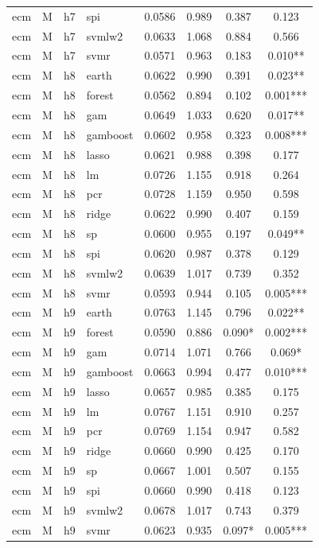 \begin{ThreePartTable}
\begin{longtable}[t]{llclcccc}
ecm & M & h7 & spi & 0.0586 & 0.989 & 0.387 & 0.123\\
ecm & M & h7 & svmlw2 & 0.0633 & 1.068 & 0.884 & 0.566\\
ecm & M & h7 & svmr & 0.0571 & 0.963 & 0.183 & 0.010**\\
\addlinespace
ecm & M & h8 & earth & 0.0622 & 0.990 & 0.391 & 0.023**\\
ecm & M & h8 & forest & 0.0562 & 0.894 & 0.102 & 0.001***\\
ecm & M & h8 & gam & 0.0649 & 1.033 & 0.620 & 0.017**\\
ecm & M & h8 & gamboost & 0.0602 & 0.958 & 0.323 & 0.008***\\
ecm & M & h8 & lasso & 0.0621 & 0.988 & 0.398 & 0.177\\
ecm & M & h8 & lm & 0.0726 & 1.155 & 0.918 & 0.264\\
ecm & M & h8 & pcr & 0.0728 & 1.159 & 0.950 & 0.598\\
ecm & M & h8 & ridge & 0.0622 & 0.990 & 0.407 & 0.159\\
ecm & M & h8 & sp & 0.0600 & 0.955 & 0.197 & 0.049**\\
ecm & M & h8 & spi & 0.0620 & 0.987 & 0.378 & 0.129\\
ecm & M & h8 & svmlw2 & 0.0639 & 1.017 & 0.739 & 0.352\\
ecm & M & h8 & svmr & 0.0593 & 0.944 & 0.105 & 0.005***\\
\addlinespace
ecm & M & h9 & earth & 0.0763 & 1.145 & 0.796 & 0.022**\\
ecm & M & h9 & forest & 0.0590 & 0.886 & 0.090* & 0.002***\\
ecm & M & h9 & gam & 0.0714 & 1.071 & 0.766 & 0.069*\\
ecm & M & h9 & gamboost & 0.0663 & 0.994 & 0.477 & 0.010***\\
ecm & M & h9 & lasso & 0.0657 & 0.985 & 0.385 & 0.175\\
ecm & M & h9 & lm & 0.0767 & 1.151 & 0.910 & 0.257\\
ecm & M & h9 & pcr & 0.0769 & 1.154 & 0.947 & 0.582\\
ecm & M & h9 & ridge & 0.0660 & 0.990 & 0.425 & 0.170\\
ecm & M & h9 & sp & 0.0667 & 1.001 & 0.507 & 0.155\\
ecm & M & h9 & spi & 0.0660 & 0.990 & 0.418 & 0.123\\
ecm & M & h9 & svmlw2 & 0.0678 & 1.017 & 0.743 & 0.379\\
ecm & M & h9 & svmr & 0.0623 & 0.935 & 0.097* & 0.005***\\

\end{longtable}
\end{ThreePartTable}
